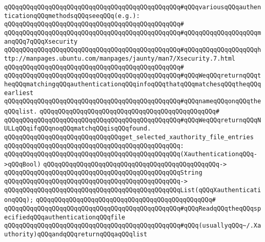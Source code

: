 \verb|qQQqqQQqqQQqqQQqqQQqqQQqqQQqqQQqqQQqqQQqqQQqqQQq#qQQqvariousqQQqauthenticationqQQqmethodsqQQqseeqQQq(e.g.):|\newline
\verb|qQQqqQQqqQQqqQQqqQQqqQQqqQQqqQQqqQQqqQQqqQQqqQQq#|\newline
\verb|qQQqqQQqqQQqqQQqqQQqqQQqqQQqqQQqqQQqqQQqqQQqqQQq#qQQqqQQqqQQqqQQqqQQqmanqQQq7qQQqXsecurity|\newline
\verb|qQQqqQQqqQQqqQQqqQQqqQQqqQQqqQQqqQQqqQQqqQQqqQQq#qQQqqQQqqQQqqQQqqQQqhttp://manpages.ubuntu.com/manpages/jaunty/man7/Xsecurity.7.html|\newline
\verb|qQQqqQQqqQQqqQQqqQQqqQQqqQQqqQQqqQQqqQQqqQQqqQQq#|\newline
\verb|qQQqqQQqqQQqqQQqqQQqqQQqqQQqqQQqqQQqqQQqqQQqqQQq#qQQqWeqQQqreturnqQQqtheqQQqmatchingqQQqauthenticationqQQqinfoqQQqthatqQQqmatchesqQQqtheqQQqearliest|\newline
\verb|qQQqqQQqqQQqqQQqqQQqqQQqqQQqqQQqqQQqqQQqqQQqqQQq#qQQqnameqQQqonqQQqtheqQQqlist.|\newline
\verb|qQQqqQQqqQQqqQQqqQQqqQQqqQQqqQQqqQQqqQQqqQQqqQQq#|\newline
\verb|qQQqqQQqqQQqqQQqqQQqqQQqqQQqqQQqqQQqqQQqqQQqqQQq#qQQqWeqQQqreturnqQQqNULLqQQqifqQQqnoqQQqmatchqQQqisqQQqfound.|\newline
\newline
\newline
\verb|qQQqqQQqqQQqqQQqqQQqqQQqqQQqqQQqget_selected_xauthority_file_entries|\newline
\verb|qQQqqQQqqQQqqQQqqQQqqQQqqQQqqQQqqQQqqQQqqQQqqQQq:|\newline
\verb|qQQqqQQqqQQqqQQqqQQqqQQqqQQqqQQqqQQqqQQqqQQqqQQq(XauthenticationqQQq->qQQqBool)|\newline
\verb|qQQqqQQqqQQqqQQqqQQqqQQqqQQqqQQqqQQqqQQqqQQqqQQq->|\newline
\verb|qQQqqQQqqQQqqQQqqQQqqQQqqQQqqQQqqQQqqQQqqQQqqQQqString|\newline
\verb|qQQqqQQqqQQqqQQqqQQqqQQqqQQqqQQqqQQqqQQqqQQqqQQq->|\newline
\verb|qQQqqQQqqQQqqQQqqQQqqQQqqQQqqQQqqQQqqQQqqQQqqQQqList(qQQqXauthenticationqQQq);|\newline
\verb|qQQqqQQqqQQqqQQqqQQqqQQqqQQqqQQqqQQqqQQqqQQqqQQq#|\newline
\verb|qQQqqQQqqQQqqQQqqQQqqQQqqQQqqQQqqQQqqQQqqQQqqQQq#qQQqReadqQQqtheqQQqspecifiedqQQqauthenticationqQQqfile|\newline
\verb|qQQqqQQqqQQqqQQqqQQqqQQqqQQqqQQqqQQqqQQqqQQqqQQq#qQQq(usuallyqQQq~/.Xauthority)qQQqandqQQqreturnqQQqaqQQqlist|\newline
